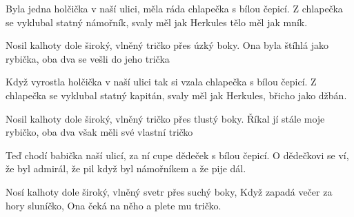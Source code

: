 
\beginverse{}
Byla jedna holčička v naší ulici,
měla ráda chlapečka s bílou čepicí.
Z chlapečka se vyklubal statný námořník,
svaly měl jak Herkules tělo měl jak mník.
\endverse{}

\beginchorus{}
Nosil kalhoty dole široký,
vlněný tričko přes úzký boky.
Ona byla štíhlá jako rybička,
oba dva se vešli do jeho trička
\endchorus{}

\beginverse{}
Když vyrostla holčička v naší ulici
tak si vzala chlapečka s bílou čepicí.
Z chlapečka se vyklubal statný kapitán,
svaly měl jak Herkules, břicho jako džbán.
\endverse{}

\beginchorus{}
Nosil kalhoty dole široký,
vlněný tričko přes tlustý boky.
Říkal jí stále moje rybičko,
oba dva však měli své vlastní tričko
\endchorus{}

\beginverse{}
Teď chodí babička naší ulicí,
za ní cupe dědeček s bílou čepicí.
O dědečkovi se ví, že byl admirál,
že pil když byl námořníkem a že pije dál.
\endverse{}

\beginchorus{}
Nosí kalhoty dole široký,
vlněný svetr přes suchý boky,
Když zapadá večer za hory sluníčko,
Ona čeká na něho a plete mu tričko.
\endchorus{}

\endsong{}
